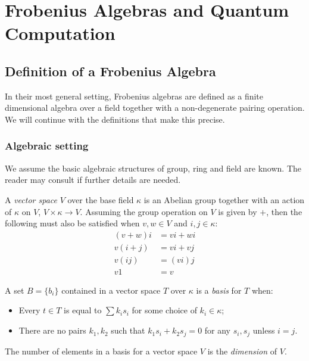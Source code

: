 \chapter{Frobenius Algebras and Quantum Computation} %
\label{cha:frobenius_algebras_and_quantum_computation}
\section{Definition of a Frobenius Algebra} %
\label{sec:definition_of_a_frobenius_algebra}
In their most general setting, Frobenius algebras are defined as a finite dimensional algebra
over a field together with a non-degenerate pairing operation. We will continue with the definitions
that make this precise.

\subsection{Algebraic setting} %
\label{sub:algebraic_setting}

We assume the basic algebraic structures of group, ring and field are known. The reader may consult
\cite{lang:algebra} if further details are needed.


\begin{definition}\label{def:vector_space}
  A \emph{vector space} $V$ over the base field $\kappa$ is an Abelian group together with an action
  of $\kappa$ on $V$, $V\times \kappa \to V$. Assuming the group operation on $V$ is given by $+$,
  then the following must also be satisfied when $v,w\in V$ and $i,j\in\kappa$:
  \begin{align}
    (v+w)i & = v i + w i\\
    v(i+j) & = v i + v j\\
    v(i j) & = (v i) j\\
    v1 &= v
  \end{align}
\end{definition}

\begin{definition}\label{def:basis_of_vector_space}
  A set $B = \{b_i\}$ contained in a vector space $T$  over $\kappa$ is a \emph{basis} for $T$ when:
  \begin{itemize}
    \item Every $t \in T$ is equal to $\sum k_i s_i$ for some choice of $k_i\in\kappa$;
    \item There are no pairs $k_1,k_2$ such that $k_1 s_i + k_2 s_j = 0$ for any $s_i, s_j$ unless
      $i = j$.
  \end{itemize}
  The number of elements in a basis for a vector space $V$ is the \emph{dimension} of $V$.
\end{definition}

